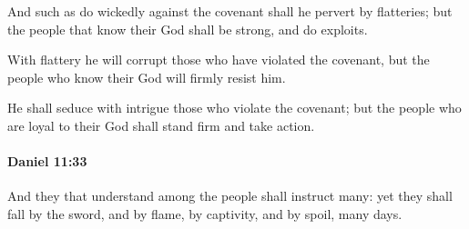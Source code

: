 			\begin{versebox}
					\item[BHS] 
					\item[LXX] 
					\item[ASV] And such as do wickedly against the covenant shall he pervert by flatteries; but the people that know their God shall be strong, and do exploits.
					\item[NIV] With flattery he will corrupt those who have violated the covenant, but the people who know their God will firmly resist him.
					\item[NRSV] He shall seduce with intrigue those who violate the covenant; but the people who are loyal to their God shall stand firm and take action.
			\end{versebox}

		\paragraph{Daniel 11:33} %
			\label{DANIEL-11-33}

			And they that understand among the people shall instruct many: yet they shall fall by the sword, and by flame, by captivity, and by spoil, many days.

